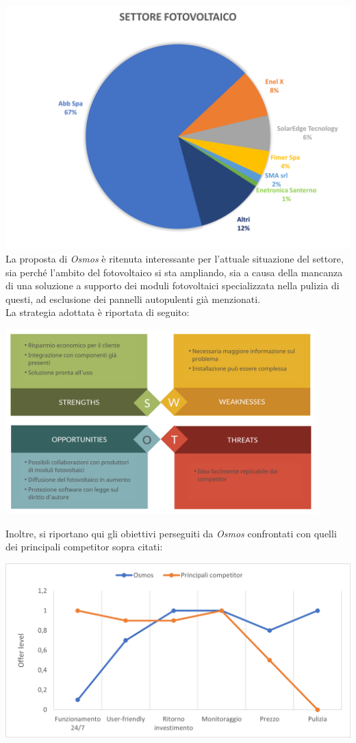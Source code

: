 \documentclass[a4paper, 12pt]{article}
\begin{document}
	\includegraphics[width=\textwidth]{Images/suddivisione_settore.png}
	La proposta di \emph{Osmos} è ritenuta interessante per l'attuale situazione del settore, sia perché l'ambito del fotovoltaico si sta ampliando, sia a causa della mancanza di una soluzione a supporto dei moduli fotovoltaici specializzata nella pulizia di questi, ad esclusione dei pannelli autopulenti già menzionati.\\
	La strategia adottata è riportata di seguito:
	\begin{center}
		\includegraphics[width=0.9\textwidth]{Images/SWOT2.png}
	\end{center}
	Inoltre, si riportano qui gli obiettivi perseguiti da \emph{Osmos} confrontati con quelli dei principali competitor sopra citati:
	\begin{center}
		\includegraphics[width=\textwidth]{Images/curve_valore.png}
	\end{center}
\end{document}

